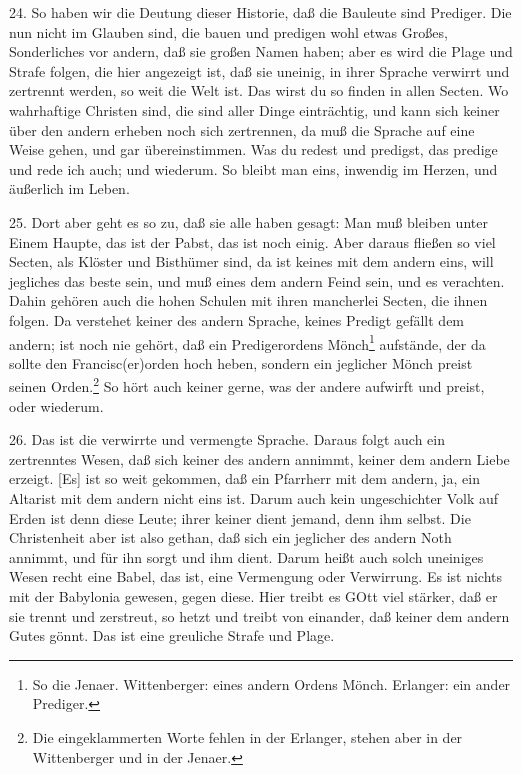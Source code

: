 24. So haben wir die Deutung dieser Historie, daß die Bauleute sind Prediger. Die nun nicht im Glauben sind, die bauen und predigen wohl etwas Großes, Sonderliches vor andern, daß sie großen Namen haben; aber es wird die Plage und Strafe folgen, die hier angezeigt ist, daß sie uneinig, in ihrer Sprache verwirrt und zertrennt werden, so weit die Welt ist. Das wirst du so finden in allen Secten. Wo wahrhaftige Christen sind, die sind aller Dinge einträchtig, und kann sich keiner über den andern erheben noch sich zertrennen, da muß die Sprache auf eine Weise gehen, und gar übereinstimmen. Was du redest und predigst, das predige und rede ich auch; und wiederum. So bleibt man eins, inwendig im Herzen, und äußerlich im Leben.

25. Dort aber geht es so zu, daß sie alle haben gesagt: Man muß bleiben unter Einem Haupte, das ist der Pabst, das ist noch einig. Aber daraus fließen so viel Secten, als Klöster und Bisthümer sind, da ist keines mit dem andern eins, will jegliches das beste sein, und muß eines dem andern Feind sein, und es verachten. Dahin gehören auch die hohen Schulen mit ihren mancherlei Secten, die ihnen folgen. Da verstehet keiner des andern Sprache, keines Predigt gefällt dem andern; ist noch nie gehört, daß ein Predigerordens Mönch\footnote{So die Jenaer. Wittenberger: eines andern Ordens Mönch. Erlanger: ein ander Prediger.} aufstände, der da sollte den Francisc(er)orden hoch heben, sondern ein jeglicher Mönch preist seinen Orden.\footnote{Die eingeklammerten Worte fehlen in der Erlanger, stehen aber in der Wittenberger und in der Jenaer.} So hört auch keiner gerne, was der andere aufwirft und preist, oder wiederum.

26. Das ist die verwirrte und vermengte Sprache. Daraus folgt auch ein zertrenntes Wesen, daß sich keiner des andern annimmt, keiner dem andern Liebe erzeigt. [Es] ist so weit gekommen, daß ein Pfarrherr mit dem andern, ja, ein Altarist mit dem andern nicht eins ist. Darum auch kein ungeschichter Volk auf Erden ist denn diese Leute; ihrer keiner dient jemand, denn ihm selbst. Die Christenheit aber ist also gethan, daß sich ein jeglicher des andern Noth annimmt, und für ihn sorgt und ihm dient. Darum heißt auch solch uneiniges Wesen recht eine Babel, das ist, eine Vermengung oder Verwirrung. Es ist nichts mit der Babylonia gewesen, gegen diese. Hier treibt es GOtt viel stärker, daß er sie trennt und zerstreut, so hetzt und treibt von einander, daß keiner dem andern Gutes gönnt. Das ist eine greuliche Strafe und Plage.

